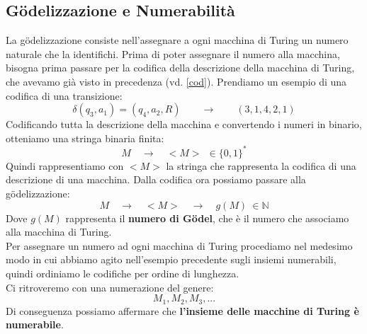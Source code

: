 \subsection{Gödelizzazione e Numerabilità}
La gödelizzazione consiste nell'assegnare a ogni macchina di Turing un numero naturale che la identifichi. 
Prima di poter assegnare il numero alla macchina, bisogna prima passare per la codifica della descrizione della macchina di Turing, che avevamo già visto in precedenza (vd. \ref{cod}). Prendiamo un esempio di una codifica di una transizione:
\[       \delta(q_3,a_1) = (q_4,a_2,R) \qquad \to \qquad (3,1,4,2,1)    \]
Codificando tutta la descrizione della macchina e convertendo i numeri in binario, otteniamo una stringa binaria finita:
\[   M \quad\to\quad <M> \ \ \in \{ 0,1 \}^*  \]
Quindi rappresentiamo con $<M>$ la stringa che rappresenta la codifica di una descrizione di una macchina. Dalla codifica ora possiamo passare alla gödelizzazione:
\[  M \quad \to \quad <M> \quad \to \quad g(M) \ \in \mathbb{N}\]
Dove $g(M)$ rappresenta il \textbf{numero di Gödel}, che è il numero che associamo alla macchina di Turing.\\
Per assegnare un numero ad ogni macchina di Turing procediamo nel medesimo modo in cui abbiamo agito nell'esempio precedente sugli insiemi numerabili, quindi ordiniamo le codifiche per ordine di lunghezza.\\
Ci ritroveremo con una numerazione del genere:
\[    M_1,M_2,M_3,...  \]
Di conseguenza possiamo affermare che \textbf{l'insieme delle macchine di Turing è numerabile}.



